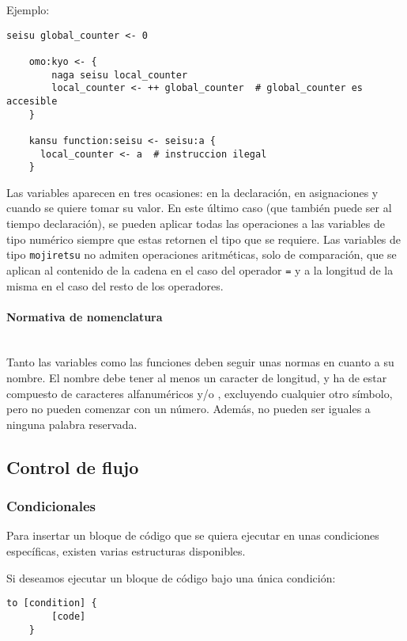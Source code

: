 \documentclass[spanish]{article}
\begin{document}
Ejemplo:

\begin{lstlisting}[language=Romaji]
    seisu global_counter <- 0

    omo:kyo <- { 
        naga seisu local_counter
        local_counter <- ++ global_counter  # global_counter es accesible
    }

    kansu function:seisu <- seisu:a {
      local_counter <- a  # instruccion ilegal
    }
\end{lstlisting}

Las variables aparecen en tres ocasiones: en la declaración, en asignaciones y cuando se quiere tomar su valor. En este último caso (que también puede ser al tiempo declaración), se pueden aplicar todas las operaciones a las variables de tipo numérico siempre que estas retornen el tipo que se requiere. Las variables de tipo \texttt{mojiretsu} no admiten operaciones aritméticas, solo de comparación, que se aplican al contenido de la cadena en el caso del operador \texttt{=} y a la longitud de la misma en el caso del resto de los operadores.

\paragraph{Normativa de nomenclatura} \hspace{0pt} \\
Tanto las variables como las funciones deben seguir unas normas en cuanto a su nombre. El nombre debe tener al menos un caracter de longitud, y ha de estar compuesto de caracteres alfanuméricos y/o \say{\_}, excluyendo cualquier otro símbolo, pero no pueden comenzar con un número. Además, no pueden ser iguales a ninguna palabra reservada.

\subsection{Control de flujo}
\label{sec:flujo}

\subsubsection{Condicionales}

Para insertar un bloque de código que se quiera ejecutar en unas condiciones específicas, existen varias estructuras disponibles.

Si deseamos ejecutar un bloque de código bajo una única condición:

\begin{lstlisting}[language=Romaji]
    to [condition] {
        [code]
    }
\end{lstlisting}
\end{document}
